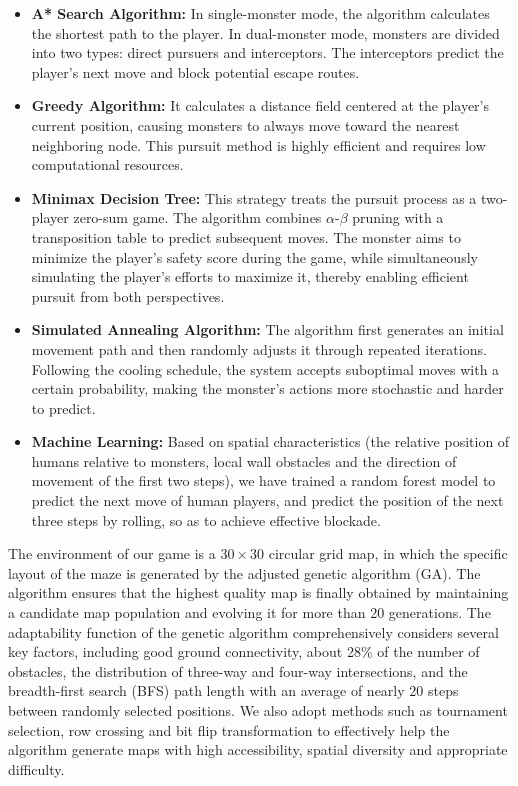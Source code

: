 \documentclass[12pt,a4paper]{article}
\begin{document}
\begin{itemize}
    \item \textbf{A* Search Algorithm:} In single-monster mode, the algorithm calculates the shortest path to the player. In dual-monster mode, monsters are divided into two types: direct pursuers and interceptors. The interceptors predict the player's next move and block potential escape routes.

    \item \textbf{Greedy Algorithm:} It calculates a distance field centered at the player's current position, causing monsters to always move toward the nearest neighboring node. This pursuit method is highly efficient and requires low computational resources.

    \item \textbf{Minimax Decision Tree:} This strategy treats the pursuit process as a two-player zero-sum game. The algorithm combines $\alpha$-$\beta$ pruning with a transposition table to predict subsequent moves. The monster aims to minimize the player's safety score during the game, while simultaneously simulating the player's efforts to maximize it, thereby enabling efficient pursuit from both perspectives.

    \item \textbf{Simulated Annealing Algorithm:} The algorithm first generates an initial movement path and then randomly adjusts it through repeated iterations. Following the cooling schedule, the system accepts suboptimal moves with a certain probability, making the monster's actions more stochastic and harder to predict.

    \item \textbf{Machine Learning:} Based on spatial characteristics (the relative position of humans relative to monsters, local wall obstacles and the direction of movement of the first two steps), we have trained a random forest model to predict the next move of human players, and predict the position of the next three steps by rolling, so as to achieve effective blockade.
    
\end{itemize}

The environment of our game is a $30\times30$ circular grid map, in which the specific layout of the maze is generated by the adjusted genetic algorithm (GA). The algorithm ensures that the highest quality map is finally obtained by maintaining a candidate map population and evolving it for more than 20 generations. The adaptability function of the genetic algorithm comprehensively considers several key factors, including good ground connectivity, about 28\% of the number of obstacles, the distribution of three-way and four-way intersections, and the breadth-first search (BFS) path length with an average of nearly 20 steps between randomly selected positions. We also adopt methods such as tournament selection, row crossing and bit flip transformation to effectively help the algorithm generate maps with high accessibility, spatial diversity and appropriate difficulty.
\end{document}
